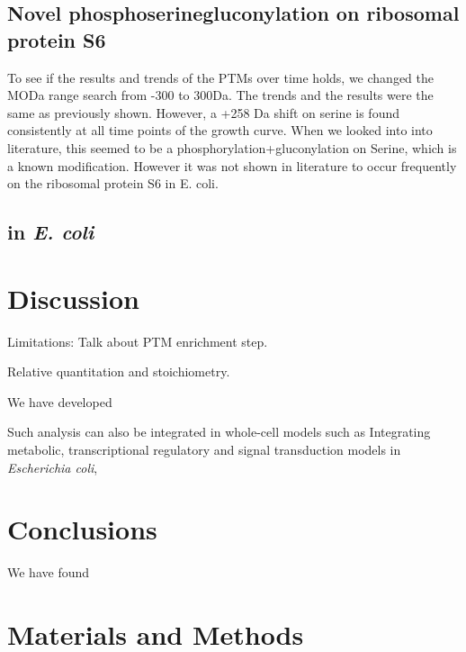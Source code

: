 \documentclass[12pt]{article}
\begin{document}


\subsection{Novel phosphoserinegluconylation on ribosomal protein S6}
To see if the results and trends of the PTMs over time holds, we changed the MODa range search from -300 to 300Da. The trends and the results were the same as previously shown. However, a +258 Da shift on serine is found consistently at all time points of the growth curve. When we looked into into literature, this seemed to be a phosphorylation+gluconylation on Serine, which is a known modification. However it was not shown in literature to occur frequently on the ribosomal protein S6 in E. coli.

\subsection{ in \emph{E. coli}}

\section{Discussion}

Limitations:
Talk about PTM enrichment step.

Relative quantitation and stoichiometry.

We have developed

Such analysis can also be integrated in whole-cell models such as \cite{Covertetal2008}
{Integrating metabolic, transcriptional regulatory and signal transduction models in \emph{Escherichia coli}},


\section{Conclusions}

We have found


\section{Materials and Methods}
\end{document}
